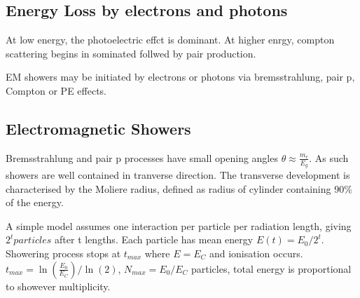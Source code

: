 \documentclass[]{article}
\begin{document}
	\subsection{Energy Loss by electrons and photons}
	
	At low energy, the photoelectric effct is dominant. At higher enrgy, compton scattering begins in sominated follwed by pair production. 
	
	EM showers may be initiated by electrons or photons via bremsstrahlung, pair p, Compton or PE effects.
	
	\subsection{Electromagnetic Showers}
	
	Bremsstrahlung and pair p processes have small opening angles $\theta \approx \frac{m_e}{E_g}$. As such showers are well contained in tranverse direction. The transverse development is characterised by the Moliere radius, defined as radius of cylinder containing 90\% of the energy.
	
	A simple model assumes one interaction per particle per radiation length, giving $2^t particles$ after t lengths. Each particle has mean energy $E(t)=E_0/2^t$. Showering process stops at $t_{max}$ where $E = E_C$ and ionisation occurs. $t_{max} = \ln(\frac{E_0}{E_C})/\ln(2)$, $N_{max}=E_0/E_C$ particles, total energy is proportional to showever multiplicity.
\end{document}
